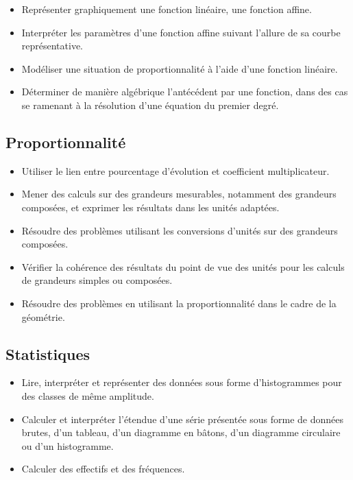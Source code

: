 \documentclass[a4paper,12pt,fleqn]{article}
\begin{document}
\begin{itemize}
	\item {}Représenter graphiquement une fonction linéaire, une fonction affine.
	\item {}Interpréter les paramètres d’une fonction affine suivant l’allure de sa courbe représentative.
	\item {}Modéliser une situation de proportionnalité à l’aide d’une fonction linéaire.
	\item {}Déterminer de manière algébrique l’antécédent par une fonction, dans des cas se ramenant à la résolution d’une équation du premier degré.
\end{itemize}

\subsection*{Proportionnalité}

\begin{itemize}
	\item {}Utiliser le lien entre pourcentage d’évolution et coefficient multiplicateur.
	\item {}Mener des calculs sur des grandeurs mesurables, notamment des grandeurs composées, et exprimer les résultats dans les unités adaptées.
	\item {}Résoudre des problèmes utilisant les conversions d’unités sur des grandeurs composées.
	\item {}Vérifier la cohérence des résultats du point de vue des unités pour les calculs de grandeurs simples ou composées.
	\item {}Résoudre des problèmes en utilisant la proportionnalité dans le cadre de la géométrie.
\end{itemize}

\subsection*{Statistiques}

\begin{itemize}
	\item {}Lire, interpréter et représenter des données sous forme d’histogrammes pour des classes de même amplitude.
	\item {}Calculer et interpréter l’étendue d’une série présentée sous forme de données brutes, d’un tableau, d’un diagramme en bâtons, d’un diagramme circulaire ou d’un histogramme.
	\item {}Calculer des effectifs et des fréquences.
\end{itemize}
\end{document}
